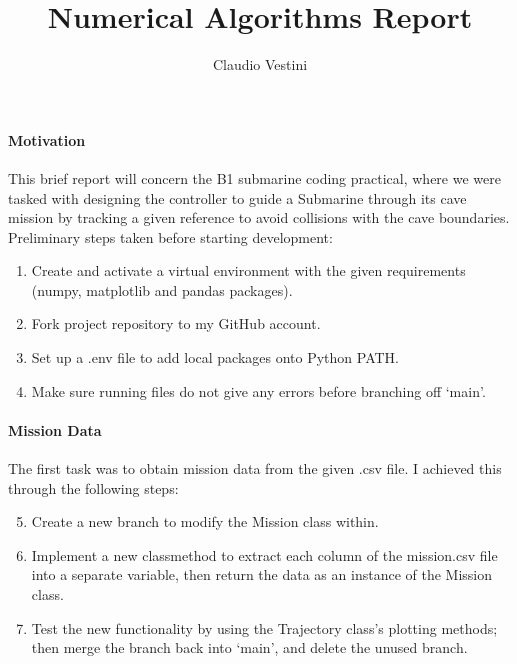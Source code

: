 \documentclass[hidelinks]{article}
\title{\vspace{-4cm} Numerical Algorithms Report}
\author{\vspace{-2cm} Claudio Vestini}
\date{}
\begin{document}
\maketitle
%
\paragraph{Motivation}
This brief report will concern the B1 submarine coding practical, where
we were tasked with designing the controller to guide a Submarine through its cave mission by tracking a given reference to avoid collisions with the cave boundaries.
Preliminary steps taken before starting development:
%
\begin{enumerate}
    \item Create and activate a virtual environment with the given requirements (numpy, matplotlib and pandas packages).
    \item Fork project repository to my GitHub account.
    \item Set up a .env file to add local packages onto Python PATH.
    \item Make sure running files do not give any errors before branching off `main'.
\end{enumerate}
%
\paragraph{Mission Data}
The first task was to obtain mission data from the given .csv file. I achieved this through the following steps:
%
\begin{enumerate}
    \setcounter{enumi}{4}
    \item Create a new branch to modify the Mission class within.
    \item Implement a new classmethod to extract each column of the mission.csv file into a separate variable, then return the data as an instance of the Mission class.
    \item Test the new functionality by using the Trajectory class's plotting methods; then merge the branch back into `main', and delete the unused branch.
\end{enumerate}
%
\end{document}
